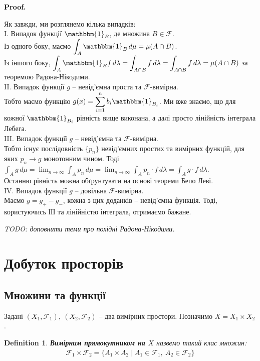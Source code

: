 \documentclass[a4paper, 10pt]{article}
\makeatletter
\theoremstyle{theoremdd}
\newtheorem{definition}[theorem]{Definition}
\renewenvironment{proof}[1][Proof.\\]{\par
\pushQED{\hfill \qed}%
\normalfont \topsep6\p@\@plus6\p@\relax
\trivlist
\item\relax
{\bfseries
#1\@addpunct{.}}\hspace\labelsep\ignorespaces
}{%
\popQED\endtrivlist\@endpefalse
}
\makeatother
\begin{document}
\begin{proof}
Як завжди, ми розглянемо кілька випадків:\\
I. Випадок функції $\mathbbm{1}_B$, де множина $B \in \mathcal{F}$.\\
Із одного боку, маємо $\displaystyle\int_A \mathbbm{1}_B\,d\mu = \mu(A \cap B)$.\\
Із іншого боку, $\displaystyle\int_A \mathbbm{1}_B f\,d\lambda = \int_{A \cap B} f\,d\lambda = \int_{A \cap B} f\,d\lambda = \mu(A \cap B)$ за теоремою Радона-Нікодими.
\bigskip \\
II. Випадок функції $g$ -- невід'ємна проста та $\mathcal{F}$-вимірна.\\
Тобто маємо функцію $g(x) = \displaystyle\sum_{i=1}^n b_i \mathbbm{1}_{B_i}$. Ми вже знаємо, що для кожної $\mathbbm{1}_{B_i}$ рівність вище виконана, а далі просто лінійність інтеграла Лебега.
\bigskip \\
III. Випадок функції $g$ -- невід'ємна та $\mathcal{F}$-вимірна.\\
Тобто існує послідовність $\{p_n\}$ невід'ємних простих та вимірних функцій, для яких $p_n \to g$ монотонним чином. Тоді\\
$\displaystyle\int_A g\,d\mu = \lim_{n \to \infty} \int_A p_n\,d\mu = \lim_{n \to \infty}\int_A p_n \cdot f\,d\lambda = \int_A g \cdot f\,d\lambda$.\\
Останню рівність можна обґрунтувати на основі теореми Бепо Леві.
\bigskip \\
IV. Випадок функції $g$ -- довільна $\mathcal{F}$-вимірна.\\
Маємо $g = g_+ - g_-$, кожна з цих доданків -- невід'ємна функція. Тоді, користуючись ІІІ та лінійністю інтеграла, отримаємо бажане.
\end{proof}

\textit{TODO: доповнити теми про похідні Радона-Нікодими.}
\newpage

\section{Добуток просторів}
\subsection{Множини та функції}
Задані $(X_1,\mathcal{F}_1),\ (X_2,\mathcal{F}_2)$ -- два вимірних простори. Позначимо $X = X_1 \times X_2$.

\begin{definition}
\textbf{Вимірним прямокутником на $X$} назвемо такий клас множин:
\begin{align*}
\mathcal{F}_1 \times \mathcal{F}_2 = \{ A_1 \times A_2 \mid A_1 \in \mathcal{F}_1,\ A_2 \in \mathcal{F}_2 \}
\end{align*}
\end{definition}
\end{document}
